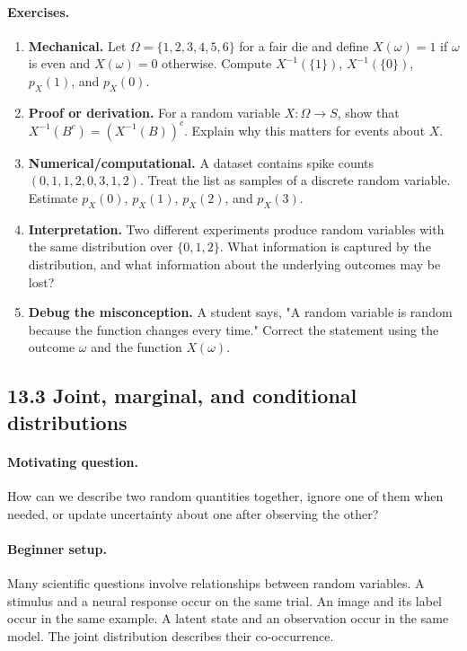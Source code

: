 \paragraph{Exercises.}
\begin{enumerate}[label=\textbf{13.2.\arabic*.}, leftmargin=*]
\item \textbf{Mechanical.} Let \(\Omega=\{1,2,3,4,5,6\}\) for a fair die and define \(X(\omega)=1\) if \(\omega\) is even and \(X(\omega)=0\) otherwise. Compute \(X^{-1}(\{1\})\), \(X^{-1}(\{0\})\), \(p_X(1)\), and \(p_X(0)\).
\item \textbf{Proof or derivation.} For a random variable \(X:\Omega\to S\), show that \(X^{-1}(B^c)=\left(X^{-1}(B)\right)^c\). Explain why this matters for events about \(X\).
\item \textbf{Numerical/computational.} A dataset contains spike counts \((0,1,1,2,0,3,1,2)\). Treat the list as samples of a discrete random variable. Estimate \(p_X(0)\), \(p_X(1)\), \(p_X(2)\), and \(p_X(3)\).
\item \textbf{Interpretation.} Two different experiments produce random variables with the same distribution over \(\{0,1,2\}\). What information is captured by the distribution, and what information about the underlying outcomes may be lost?
\item \textbf{Debug the misconception.} A student says, "A random variable is random because the function changes every time." Correct the statement using the outcome \(\omega\) and the function \(X(\omega)\).
\end{enumerate}

\subsection{13.3 Joint, marginal, and conditional distributions}

\paragraph{Motivating question.}
How can we describe two random quantities together, ignore one of them when needed, or update uncertainty about one after observing the other?

\paragraph{Beginner setup.}
Many scientific questions involve relationships between random variables. A stimulus and a neural response occur on the same trial. An image and its label occur in the same example. A latent state and an observation occur in the same model. The joint distribution describes their co-occurrence.

